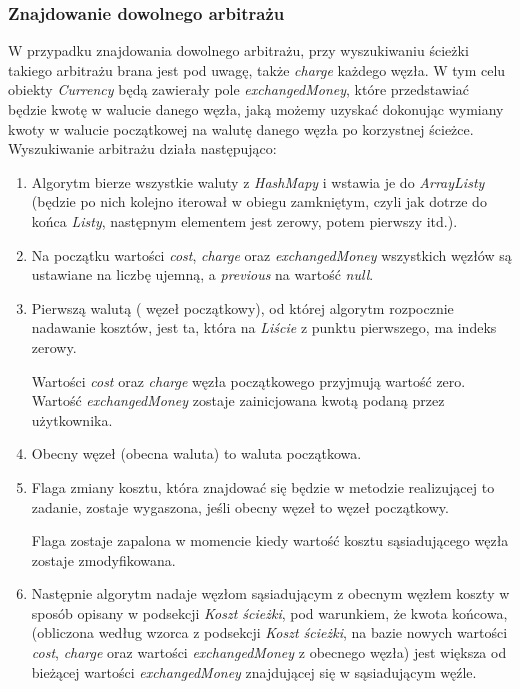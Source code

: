 \documentclass[a4paper,11pt]{article}
\begin{document}
\subsubsection{Znajdowanie dowolnego arbitrażu}
W przypadku znajdowania dowolnego arbitrażu, przy wyszukiwaniu ścieżki takiego arbitrażu brana jest pod uwagę, także \textit{charge} każdego węzła.
W tym celu obiekty \textit{Currency} będą zawierały pole \textit{exchangedMoney}, które przedstawiać będzie kwotę w walucie danego węzła, jaką możemy uzyskać dokonując wymiany kwoty w walucie początkowej na walutę danego węzła po korzystnej ścieżce.
\\Wyszukiwanie arbitrażu działa następująco:
\begin{enumerate}
\item  Algorytm bierze wszystkie waluty z \textit{HashMapy} i wstawia je do \textit{ArrayListy} (będzie po nich kolejno iterował w obiegu zamkniętym, czyli jak dotrze do końca \textit{Listy}, następnym elementem jest zerowy, potem pierwszy itd.).
\item Na początku wartości \textit{cost}, \textit{charge} oraz \textit{exchangedMoney} wszystkich węzłów są ustawiane na liczbę ujemną, a \textit{previous} na wartość \textit{null}.
\item Pierwszą walutą ( węzeł początkowy), od której algorytm rozpocznie nadawanie kosztów, jest ta, która na \textit{Liście} z punktu pierwszego, ma indeks zerowy.

		Wartości \textit{cost} oraz \textit{charge} węzła początkowego przyjmują wartość zero. Wartość \textit{exchangedMoney} zostaje zainicjowana kwotą podaną przez użytkownika.
\item Obecny węzeł (obecna waluta) to waluta początkowa.
\item Flaga zmiany kosztu, która znajdować się będzie w metodzie realizującej to zadanie, zostaje wygaszona, jeśli obecny węzeł to węzeł początkowy.

Flaga zostaje zapalona w momencie kiedy wartość kosztu sąsiadującego węzła zostaje zmodyfikowana.
\item Następnie algorytm nadaje węzłom sąsiadującym z obecnym węzłem koszty w sposób opisany w podsekcji \textit{Koszt ścieżki}, pod warunkiem, że kwota końcowa, (obliczona według wzorca z podsekcji \textit{Koszt ścieżki},  na bazie nowych wartości \textit{cost}, \textit{charge} oraz wartości \textit{exchangedMoney} z obecnego węzła) jest większa od bieżącej wartości \textit{exchangedMoney} znajdującej się w sąsiadującym węźle.


\end{enumerate}
\end{document}
